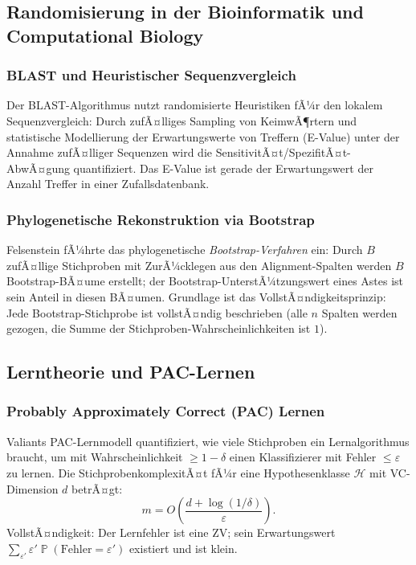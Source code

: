 ﻿\documentclass[12pt,a4paper]{article}
\theoremstyle{definition}
\theoremstyle{plain}
\theoremstyle{remark}
\DeclareMathOperator{\Prob}{\mathbb{P}}
\begin{document}
\subsection{Randomisierung in der Bioinformatik und Computational Biology}

\subsubsection{BLAST und Heuristischer Sequenzvergleich}
Der BLAST-Algorithmus \cite{altschul1990basic} nutzt randomisierte Heuristiken
fÃ¼r den lokalem Sequenzvergleich: Durch zufÃ¤lliges Sampling von KeimwÃ¶rtern
und statistische Modellierung der Erwartungswerte von Treffern (E-Value)
unter der Annahme zufÃ¤lliger Sequenzen wird die SensitivitÃ¤t/SpezifitÃ¤t-AbwÃ¤gung
quantifiziert. Das E-Value ist gerade der Erwartungswert der Anzahl Treffer
in einer Zufallsdatenbank.

\subsubsection{Phylogenetische Rekonstruktion via Bootstrap}
Felsenstein \cite{felsenstein1985confidence} fÃ¼hrte das phylogenetische
\emph{Bootstrap-Verfahren} ein: Durch $B$ zufÃ¤llige Stichproben mit ZurÃ¼cklegen
aus den Alignment-Spalten werden $B$ Bootstrap-BÃ¤ume erstellt; der
Bootstrap-UnterstÃ¼tzungswert eines Astes ist sein Anteil in diesen BÃ¤umen.
Grundlage ist das VollstÃ¤ndigkeitsprinzip: Jede Bootstrap-Stichprobe ist
vollstÃ¤ndig beschrieben (alle $n$ Spalten werden gezogen, die Summe der
Stichproben-Wahrscheinlichkeiten ist $1$).

\subsection{Lerntheorie und PAC-Lernen}

\subsubsection{Probably Approximately Correct (PAC) Lernen}
Valiants PAC-Lernmodell \cite{valiant1984theory} quantifiziert, wie viele
Stichproben ein Lernalgorithmus braucht, um mit Wahrscheinlichkeit $\geq 1-\delta$
einen Klassifizierer mit Fehler $\leq \varepsilon$ zu lernen. Die
StichprobenkomplexitÃ¤t fÃ¼r eine Hypothesenklasse $\mathcal{H}$ mit
VC-Dimension $d$ betrÃ¤gt:
\[
  m = O\!\left(\frac{d + \log(1/\delta)}{\varepsilon}\right).
\]
VollstÃ¤ndigkeit: Der Lernfehler ist eine ZV; sein Erwartungswert
$\sum_{\varepsilon'} \varepsilon' \Prob(\text{Fehler}=\varepsilon')$ existiert
und ist klein.
\end{document}
